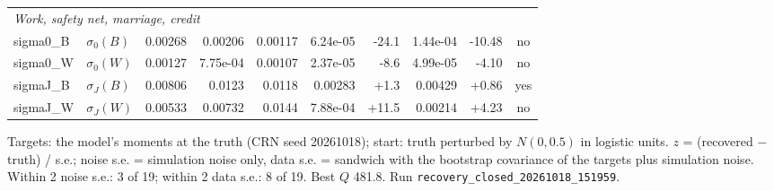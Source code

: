\begin{table}[htbp]
\begin{tabular}{llrrrrrrrc}
\multicolumn{10}{l}{\textit{Work, safety net, marriage, credit}} \\
sigma0\_B & $\sigma_0(B)$ & 0.00268 & 0.00206 & 0.00117 & 6.24e-05 & -24.1 & 1.44e-04 & -10.48 & no \\
sigma0\_W & $\sigma_0(W)$ & 0.00127 & 7.75e-04 & 0.00107 & 2.37e-05 & -8.6 & 4.99e-05 & -4.10 & no \\
sigmaJ\_B & $\sigma_J(B)$ & 0.00806 & 0.0123 & 0.0118 & 0.00283 & +1.3 & 0.00429 & +0.86 & yes \\
sigmaJ\_W & $\sigma_J(W)$ & 0.00533 & 0.00732 & 0.0144 & 7.88e-04 & +11.5 & 0.00214 & +4.23 & no \\
\bottomrule
\end{tabular}
\begin{minipage}{0.95\textwidth}\footnotesize Targets: the model's moments at the truth (CRN seed 20261018); start: truth perturbed by $N(0, 0.5)$ in logistic units. $z$ = (recovered $-$ truth) / s.e.; noise s.e. = simulation noise only, data s.e. = sandwich with the bootstrap covariance of the targets plus simulation noise. Within 2 noise s.e.: 3 of 19; within 2 data s.e.: 8 of 19. Best $Q$ 481.8. Run \texttt{recovery\_closed\_20261018\_151959}.\end{minipage}
\end{table}
